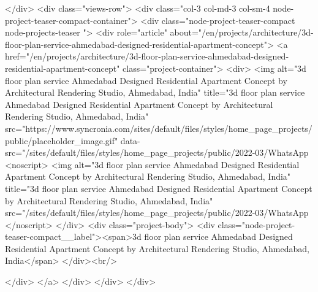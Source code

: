   </div>
    <div class="views-row">
    <div class="col-3 col-md-3 col-sm-4 node-project-teaser-compact-container">
	<div class="node-project-teaser-compact node-projects-teaser ">
		<div  role="article" about="/en/projects/architecture/3d-floor-plan-service-ahmedabad-designed-residential-apartment-concept">
			<a href="/en/projects/architecture/3d-floor-plan-service-ahmedabad-designed-residential-apartment-concept" class="project-container">
				<div>
					<img alt="3d floor plan service Ahmedabad Designed Residential Apartment Concept by Architectural Rendering Studio, Ahmedabad, India" title="3d floor plan service Ahmedabad Designed Residential Apartment Concept by Architectural Rendering Studio, Ahmedabad, India" src="https://www.syncronia.com/sites/default/files/styles/home_page_projects/public/placeholder_image.gif" data-src="/sites/default/files/styles/home_page_projects/public/2022-03/WhatsApp%
					<noscript>
						<img alt="3d floor plan service Ahmedabad Designed Residential Apartment Concept by Architectural Rendering Studio, Ahmedabad, India" title="3d floor plan service Ahmedabad Designed Residential Apartment Concept by Architectural Rendering Studio, Ahmedabad, India" src="/sites/default/files/styles/home_page_projects/public/2022-03/WhatsApp%
					</noscript>
				</div>
				<div class="project-body">
				<div class="node-project-teaser-compact__label"><span>3d floor plan service Ahmedabad Designed Residential Apartment Concept by Architectural Rendering Studio, Ahmedabad, India</span>
</div><br/>
				
				</div>
			</a>
		</div>
	</div>
</div>


